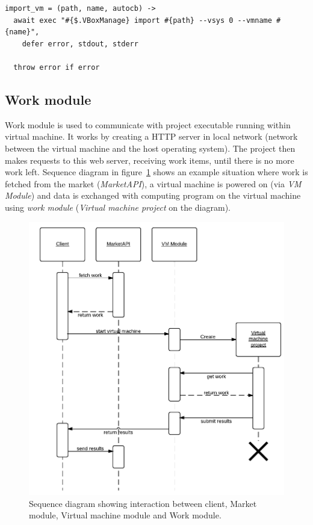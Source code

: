\begin{lstlisting}[caption=Function wrapping \emph{vm import} method.]
import_vm = (path, name, autocb) ->
  await exec "#{$.VBoxManage} import #{path} --vsys 0 --vmname #{name}",
    defer error, stdout, stderr

  throw error if error
\end{lstlisting}

\subsection{Work module}
\label{s:workmod}

Work module is used to communicate with project executable running within virtual machine. It works by creating a HTTP server in local network (network between the virtual machine and the host operating system). The project then makes requests to this web server, receiving work items, until there is no more work left. Sequence diagram in figure~\ref{f:clientseq} shows an example situation where work is fetched from the market (\emph{MarketAPI}), a virtual machine is powered on (via \emph{VM Module}) and data is exchanged with computing program on the virtual machine using \emph{work module} (\emph{Virtual machine project} on the diagram).

\begin{figure}
\centering
\includegraphics{diagrams/ClientSequence.pdf}
\caption{Sequence diagram showing interaction between client, Market module, Virtual machine module and Work module.}
\label{f:clientseq}
\end{figure}

